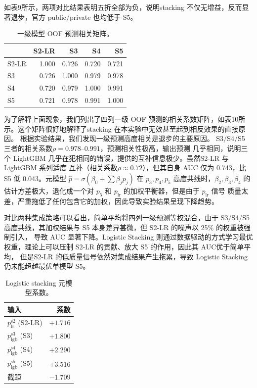 \documentclass[12pt,UTF8,fontset=windows]{ctexart}
\begin{document}
如表9所示，两项对比结果表明五折全部为负，说明stacking 不仅无增益，反而显著退步，官方 public/private 也均低于 S5。

\begin{table}[h]
\centering\small
\caption{一级模型 OOF 预测相关矩阵。}\label{tab:rq3-corr}
\begin{tabular}{lrrrr}
\toprule
& S2-LR & S3    & S4    & S5 \\
\midrule
S2-LR & 1.000 & 0.726 & 0.720 & 0.721 \\
S3    & 0.726 & 1.000 & 0.979 & 0.978 \\
S4    & 0.720 & 0.979 & 1.000 & 0.991 \\
S5    & 0.721 & 0.978 & 0.991 & 1.000 \\
\bottomrule
\end{tabular}
\end{table}

为了解释上面现象，我们列出了四列一级 OOF 预测的相关系数矩阵，如表10所示。这个矩阵很好地解释了stacking 在本实验中无效甚至起到相反效果的直接原因。
根据实验结果，我们发现一级预测高度相关是退步的主要原因。 S3/S4/S5 三者的相关系数$\rho=0.978\text{--}0.991$，预测相关性极高，输出预测
几乎相同，说明三个 LightGBM 几乎在犯相同的错误，提供的互补信息极少。虽然S2-LR 与 LightGBM 系列适度
互补（相关系数$\rho\approx0.72$），但其自身 AUC 仅为 0.743，比 S5 低 0.043。元模型
$\hat p=\sigma(\beta_0+\sum\beta_j p_j)$ 在 $p_3,p_4,p_5$ 高度共线时，$\beta_2,\beta_3,\beta_4$
的估计方差极大，退化成一个对 $p_5$ 和 $p_{\mathrm{lr}}$ 的加权平衡器，但是由于 $p_{\mathrm{lr}}$ 信号
质量太差，严重拖低了任何包含它的加权，因此导致实验结果呈现下降趋势。

对比两种集成策略可以看出，简单平均将四列一级预测等权混合，由于 S3/S4/S5 高度共线，其加权结果与 S5 本身差异甚微，但 S2-LR 的噪声以 25\% 的权重被强制引入，
导致 AUC 显著下降。Logistic Stacking 则通过数据驱动的方式学习最优权重，理论上可以压制 S2-LR 的贡献、放大 S5 的作用，因此其 AUC优于简单平均，
但是S2-LR 的低质量信号依然对集成结果产生拖累，导致 Logistic Stacking 仍未能超越最优单模型 S5。

\begin{table}[h]
\centering\small
\caption{Logistic stacking 元模型系数。}\label{tab:meta-coeffs}
\begin{tabular}{lr}
\toprule
输入 & 系数 \\
\midrule
$p_{\text{lr}}^{\text{s2}}$ (S2-LR) & $+1.716$ \\
$p_{\text{lgb}}^{\text{s3}}$ (S3)   & $+1.800$ \\
$p_{\text{lgb}}^{\text{s4}}$ (S4)   & $+2.290$ \\
$p_{\text{lgb}}^{\text{s5}}$ (S5)   & $+3.516$ \\
截距 & $-1.709$ \\
\bottomrule
\end{tabular}
\end{table}
\end{document}

